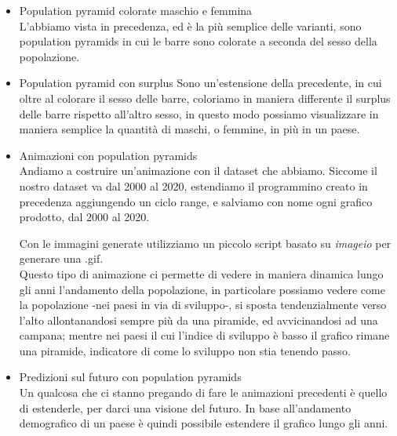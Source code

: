 \documentclass[11pt, oneside]{article}   	%
\begin{document}
\begin{itemize}
\item Population pyramid colorate maschio e femmina\\
L'abbiamo vista in precedenza, ed è la più semplice delle varianti, sono population pyramids in cui le barre sono colorate a seconda del sesso della popolazione.
\item Population pyramid con surplus
Sono un'estensione della precedente, in cui oltre al colorare il sesso delle barre, coloriamo in maniera differente il surplus delle barre rispetto all'altro sesso, in questo modo possiamo visualizzare in maniera semplice la quantità di maschi, o femmine, in più in un paese.
\begin{center}
\end{center}
\item Animazioni con population pyramids\\
Andiamo a costruire un'animazione con il dataset che abbiamo.
Siccome il nostro dataset va dal 2000 al 2020, estendiamo il programmino creato in precedenza aggiungendo un ciclo range, e salviamo con nome ogni grafico prodotto, dal 2000 al 2020.

\begin{center}


\end{center}
Con le immagini generate utilizziamo un piccolo script basato su \emph{imageio} per generare una .gif.\\
Questo tipo di animazione ci permette di vedere in maniera dinamica lungo gli anni l'andamento della popolazione, in particolare possiamo vedere come la popolazione -nei paesi in via di sviluppo-, si sposta tendenzialmente verso l'alto allontanandosi sempre più da una piramide, ed avvicinandosi ad una campana; mentre nei paesi il cui l'indice di sviluppo è basso il grafico rimane una piramide, indicatore di come lo sviluppo non stia tenendo passo.

\item Predizioni sul futuro con population pyramids\\
Un qualcosa che ci stanno pregando di fare le animazioni precedenti è quello di estenderle, per darci una visione del futuro. In base all'andamento demografico di un paese è quindi possibile estendere il grafico lungo gli anni.

\end{itemize}
\end{document}
